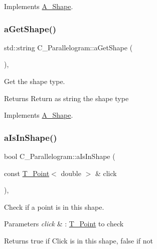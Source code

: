 Implements \hyperlink{classA__Shape_a9fd1285bd63b1fc88943c9969bf01a5c}{A\+\_\+\+Shape}.

\mbox{\label{classC__Parallelogram_a373fdd3ebdfeffcaa0a72ff7001af8ec}} 
\subsubsection{\texorpdfstring{a\+Get\+Shape()}{aGetShape()}}
{\footnotesize\ttfamily std\+::string C\+\_\+\+Parallelogram\+::a\+Get\+Shape (\begin{DoxyParamCaption}{ }\end{DoxyParamCaption})\hspace{0.3cm}{\ttfamily [override]}, {\ttfamily [virtual]}}



Get the shape type. 

\begin{DoxyReturn}{Returns}
Return as string the shape type 
\end{DoxyReturn}


Implements \hyperlink{classA__Shape_a1b202256a4e5dcb0edab4ab93a37122c}{A\+\_\+\+Shape}.

\mbox{\label{classC__Parallelogram_a9ccee396c30606bfe64df416c22586d5}} 
\subsubsection{\texorpdfstring{a\+Is\+In\+Shape()}{aIsInShape()}}
{\footnotesize\ttfamily bool C\+\_\+\+Parallelogram\+::a\+Is\+In\+Shape (\begin{DoxyParamCaption}\item[{const \hyperlink{classT__Point}{T\+\_\+\+Point}$<$ double $>$ \&}]{click }\end{DoxyParamCaption})\hspace{0.3cm}{\ttfamily [override]}, {\ttfamily [virtual]}}



Check if a point is in this shape. 


\begin{DoxyParams}{Parameters}
{\em click} & \+: \hyperlink{classT__Point}{T\+\_\+\+Point} to check \\
\hline
\end{DoxyParams}
\begin{DoxyReturn}{Returns}
true if Click is in this shape, false if not 
\end{DoxyReturn}


